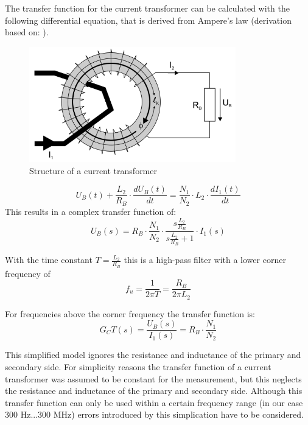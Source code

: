 The transfer function for the current transformer can be calculated with the following differential equation, that is derived from Ampere's law (derivation based on: \cite{highdynamiccurrent}).\\
\begin{figure}
	\includegraphics[width=0.8\textwidth]{figures/Theory/ct_setup}
	\caption[Kurze Abbildungsbeschreibung]{Structure of a current transformer \protect\footnotemark}
	\label{fig.ct_setup}
\end{figure}

\begin{equation}
U_B(t) + \frac{L_2}{R_B} \cdot \frac{dU_B(t)}{dt}=\frac{N_1}{N_2} \cdot L_2 \cdot \frac{dI_1(t)}{dt}
\end{equation}
This results in a complex transfer function of: 
\begin{equation}
U_B(s) = R_B \cdot \frac{N_1}{N_2} \cdot \frac{s \frac{L_2}{R_B}}{s \frac{L_2}{R_B} +1} \cdot I_1(s)
\end{equation}

With the time constant $T=\frac{L_2}{R_B}$ this is a high-pass filter with a lower corner frequency of 
\begin{equation}
f_u= \frac{1}{2 \pi T} = \frac{R_B}{2 \pi L_2}
\end{equation}

For frequencies above the corner frequency the transfer function is:
\begin{equation}
G_CT(s) = \frac{U_B(s)}{I_1(s)}=R_B \cdot \frac{N_1}{N_2}
\end{equation}

This simplified model ignores the resistance and inductance of the primary and secondary side. 
For simplicity reasons the transfer function of a current transformer was assumed to be constant for the measurement, but this neglects the resistance and inductance of the primary and secondary side. Although this transfer function can only be used within a certain frequency range (in our case 300 Hz...300 MHz) errors introduced by this simplication have to be considered. 


